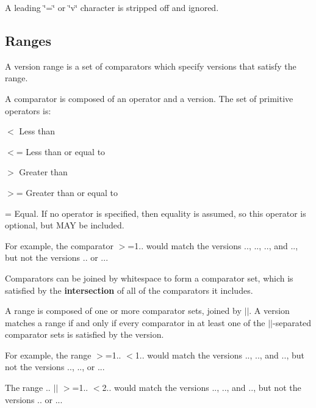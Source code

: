 A leading {\ttfamily \char`\"{}=\char`\"{}} or {\ttfamily \char`\"{}v\char`\"{}} character is stripped off and ignored.

\subsection*{Ranges}

A {\ttfamily version range} is a set of {\ttfamily comparators} which specify versions that satisfy the range.

A {\ttfamily comparator} is composed of an {\ttfamily operator} and a {\ttfamily version}. The set of primitive {\ttfamily operators} is\+:


\begin{DoxyItemize}
\item {\ttfamily $<$} Less than
\item {\ttfamily $<$=} Less than or equal to
\item {\ttfamily $>$} Greater than
\item {\ttfamily $>$=} Greater than or equal to
\item {\ttfamily =} Equal. If no operator is specified, then equality is assumed, so this operator is optional, but M\+AY be included.
\end{DoxyItemize}

For example, the comparator {\ttfamily $>$=1..} would match the versions {..}, {..}, {..}, and {..}, but not the versions {..} or {..}.

Comparators can be joined by whitespace to form a {\ttfamily comparator set}, which is satisfied by the {\bfseries intersection} of all of the comparators it includes.

A range is composed of one or more comparator sets, joined by {\ttfamily $\vert$$\vert$}. A version matches a range if and only if every comparator in at least one of the {\ttfamily $\vert$$\vert$}-\/separated comparator sets is satisfied by the version.

For example, the range {\ttfamily $>$=1.. $<$1..} would match the versions {..}, {..}, and {..}, but not the versions {..}, {..}, or {..}.

The range {.. $\vert$$\vert$ $>$=1.. $<$2..} would match the versions {..}, {..}, and {..}, but not the versions {..} or {..}.

